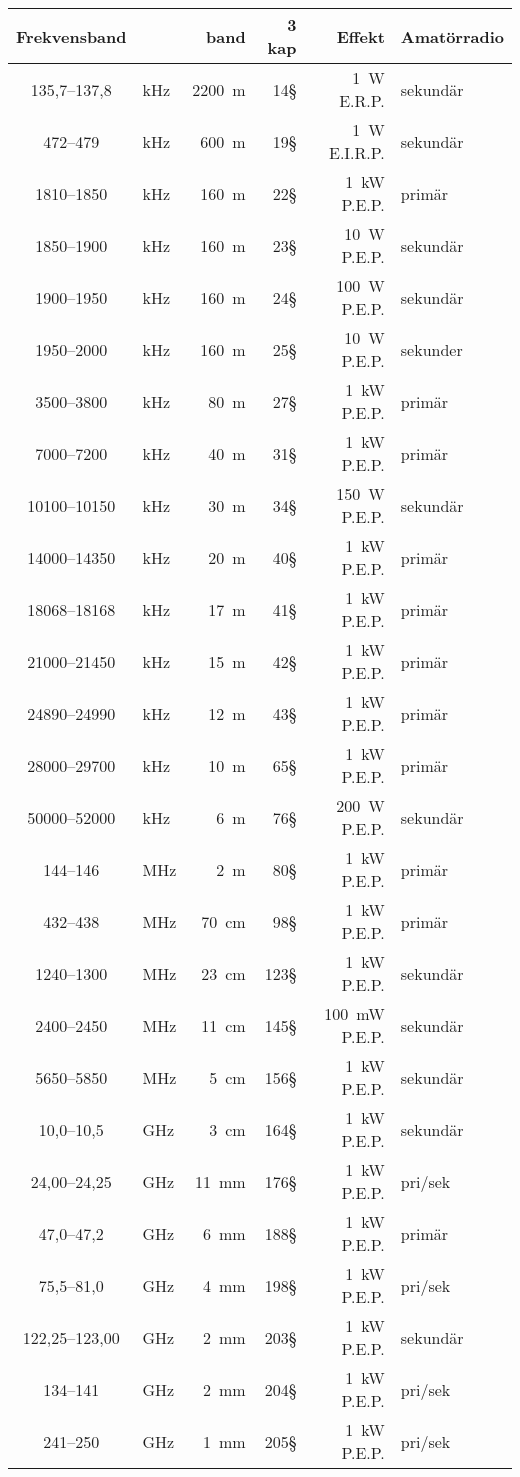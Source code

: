 \begin{tabular}{clr|rr|l}
Frekvensband    &     & band   & 3 kap & Effekt       & Amatörradio \\ \hline
  135,7--137,8 & kHz & 2200~m &  14§  & 1~W E.R.P.  & sekundär \\
    472--479 & kHz & 600~m  &  19§  & 1~W E.I.R.P. & sekundär \\
   1810--1850 & kHz & 160~m  &  22§  & 1~kW P.E.P.  & primär \\
   1850--1900 & kHz & 160~m  &  23§  & 10~W P.E.P.  & sekundär \\
   1900--1950 & kHz & 160~m  &  24§  & 100~W P.E.P. & sekundär \\
   1950--2000 & kHz & 160~m  &  25§  & 10~W P.E.P.  & sekunder \\
   3500--3800 & kHz &  80~m  &  27§  & 1~kW P.E.P.  & primär \\
   7000--7200 & kHz &  40~m  &  31§  & 1~kW P.E.P.  & primär \\
  10100--10150 & kHz &  30~m  &  34§  & 150~W P.E.P. & sekundär \\
  14000--14350 & kHz &  20~m  &  40§  & 1~kW P.E.P.  & primär \\
  18068--18168 & kHz &  17~m  &  41§  & 1~kW P.E.P.  & primär \\
  21000--21450 & kHz &  15~m  &  42§  & 1~kW P.E.P.  & primär \\
  24890--24990 & kHz &  12~m  &  43§  & 1~kW P.E.P.  & primär \\
  28000--29700 & kHz &  10~m  &  65§  & 1~kW P.E.P.  & primär \\
  50000--52000 & kHz &   6~m  &  76§  & 200~W P.E.P. & sekundär \\ \hline
    144--146 & MHz &   2~m  &  80§  & 1~kW P.E.P.  & primär \\
    432--438 & MHz &  70~cm &  98§  & 1~kW P.E.P.  & primär \\
   1240--1300 & MHz &  23~cm & 123§  & 1~kW P.E.P.  & sekundär \\
   2400--2450 & MHz &  11~cm & 145§  & 100~mW P.E.P. & sekundär \\
   5650--5850 & MHz &   5~cm & 156§  & 1~kW P.E.P.  & sekundär \\
   10,0--10,5 & GHz &   3~cm & 164§  & 1~kW P.E.P.  & sekundär \\
  24,00--24,25 & GHz &  11~mm & 176§  & 1~kW P.E.P.  & pri/sek \\
   47,0--47,2  & GHz &   6~mm & 188§  & 1~kW P.E.P.  & primär \\
   75,5--81,0  & GHz &   4~mm & 198§  & 1~kW P.E.P.  & pri/sek \\
 122,25--123,00   & GHz &   2~mm & 203§  & 1~kW P.E.P.  & sekundär \\
    134--141   & GHz &   2~mm & 204§  & 1~kW P.E.P.  & pri/sek \\
    241--250   & GHz &   1~mm & 205§  & 1~kW P.E.P.  & pri/sek \\
\end{tabular}

